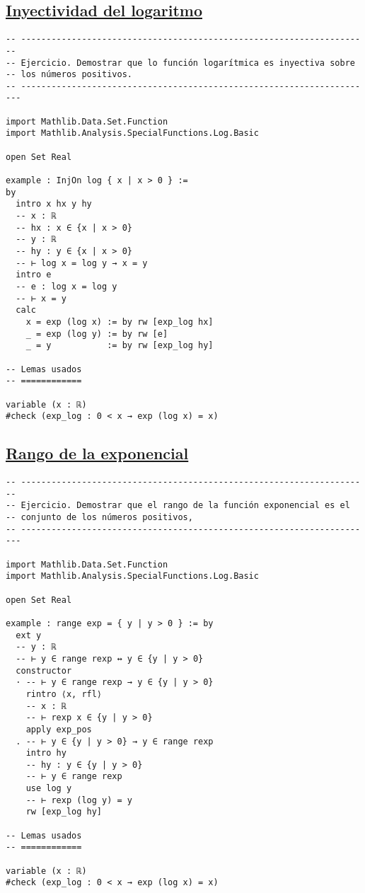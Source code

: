\subsection{\href{./src/Conjuntos/Inyectividad\_del\_logaritmo.lean}{Inyectividad del logaritmo}}
\label{sec:orgcba88de}
\begin{verbatim}
-- ---------------------------------------------------------------------
-- Ejercicio. Demostrar que lo función logarítmica es inyectiva sobre
-- los números positivos.
-- ----------------------------------------------------------------------

import Mathlib.Data.Set.Function
import Mathlib.Analysis.SpecialFunctions.Log.Basic

open Set Real

example : InjOn log { x | x > 0 } :=
by
  intro x hx y hy
  -- x : ℝ
  -- hx : x ∈ {x | x > 0}
  -- y : ℝ
  -- hy : y ∈ {x | x > 0}
  -- ⊢ log x = log y → x = y
  intro e
  -- e : log x = log y
  -- ⊢ x = y
  calc
    x = exp (log x) := by rw [exp_log hx]
    _ = exp (log y) := by rw [e]
    _ = y           := by rw [exp_log hy]

-- Lemas usados
-- ============

variable (x : ℝ)
#check (exp_log : 0 < x → exp (log x) = x)
\end{verbatim}

\subsection{\href{./src/Conjuntos/Rango\_de\_la\_exponencial.lean}{Rango de la exponencial}}
\label{sec:orgd5093d1}
\begin{verbatim}
-- ---------------------------------------------------------------------
-- Ejercicio. Demostrar que el rango de la función exponencial es el
-- conjunto de los números positivos,
-- ----------------------------------------------------------------------

import Mathlib.Data.Set.Function
import Mathlib.Analysis.SpecialFunctions.Log.Basic

open Set Real

example : range exp = { y | y > 0 } := by
  ext y
  -- y : ℝ
  -- ⊢ y ∈ range rexp ↔ y ∈ {y | y > 0}
  constructor
  · -- ⊢ y ∈ range rexp → y ∈ {y | y > 0}
    rintro ⟨x, rfl⟩
    -- x : ℝ
    -- ⊢ rexp x ∈ {y | y > 0}
    apply exp_pos
  . -- ⊢ y ∈ {y | y > 0} → y ∈ range rexp
    intro hy
    -- hy : y ∈ {y | y > 0}
    -- ⊢ y ∈ range rexp
    use log y
    -- ⊢ rexp (log y) = y
    rw [exp_log hy]

-- Lemas usados
-- ============

variable (x : ℝ)
#check (exp_log : 0 < x → exp (log x) = x)
\end{verbatim}

